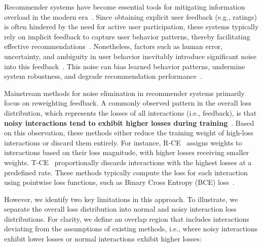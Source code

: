 Recommender systems have become essential tools for mitigating information overload in the modern era~\cite{koren2009matrix, he2020lightgcn}. Since obtaining explicit user feedback (e.g., ratings) is often hindered by the need for active user participation, these systems typically rely on implicit feedback to capture user behavior patterns, thereby facilitating effective recommendations~\cite{gantner2012personalized, he2024double, saito2020unbiased}. Nonetheless, factors such as human error, uncertainty, and ambiguity in user behavior inevitably introduce significant noise into this feedback~\cite{toledo2016fuzzy, zhang2023robust}. This noise can bias learned behavior patterns, undermine system robustness, and degrade recommendation performance~\cite{zhang2023robust, wu2016collaborative}.

Mainstream methods for noise elimination in recommender systems primarily focus on reweighting feedback. A commonly observed pattern in the overall loss distribution, which represents the losses of all interactions (i.e., feedback), is that \textbf{noisy interactions tend to exhibit higher losses during training}~\cite{wang2021denoising, he2024double, gao2022selfguided, lin2023autodenoise}. Based on this observation, these methods either reduce the training weight of high-loss interactions or discard them entirely. For instance, R-CE~\cite{wang2021denoising} assigns weights to interactions based on their loss magnitude, with higher losses receiving smaller weights. T-CE~\cite{wang2021denoising} proportionally discards interactions with the highest losses at a predefined rate. These methods typically compute the loss for each interaction using pointwise loss functions, such as Binary Cross Entropy (BCE) loss~\cite{wang2021denoising, he2024double}. 

However, we identify two key limitations in this approach. To illustrate, we separate the overall loss distribution into normal and noisy interaction loss distributions. For clarity, we define an overlap region that includes interactions deviating from the assumptions of existing methods, i.e., where noisy interactions exhibit lower losses or normal interactions exhibit higher losses:

